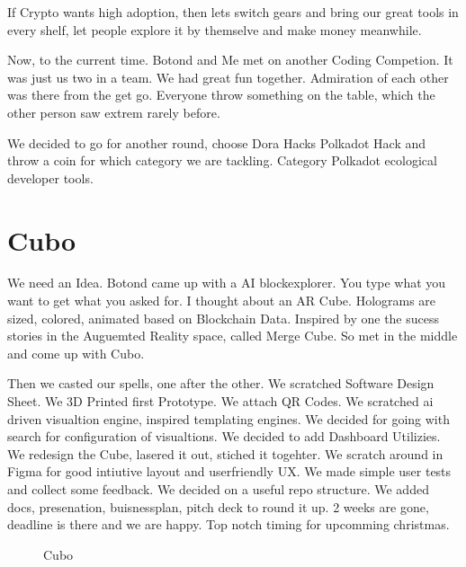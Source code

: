 \documentclass{report}
\begin{document}
If Crypto wants high adoption, then lets switch gears and bring our great tools in every shelf, let people explore it by themselve and make money meanwhile.

Now, to the current time.
Botond and Me met on another Coding Competion. It was just us two in a team.
We had great fun together.
Admiration of each other was there from the get go.
Everyone throw something on the table, which the other person saw extrem rarely before.

We decided to go for another round, choose Dora Hacks Polkadot Hack and throw a coin for which category we are tackling.
Category Polkadot ecological developer tools.

\newpage

\section{Cubo}

We need an Idea. Botond came up with a AI blockexplorer.
You type what you want to get what you asked for.
I thought about an AR Cube. Holograms are sized, colored, animated based on Blockchain Data.
Inspired by one the sucess stories in the Auguemted Reality space, called Merge Cube.
So met in the middle and come up with Cubo.

Then we casted our spells, one after the other. We scratched Software Design Sheet.
We 3D Printed first Prototype.
We attach QR Codes.
We scratched ai driven visualtion engine, inspired templating engines.
We decided for going with search for configuration of visualtions.
We decided to add Dashboard Utilizies.
We redesign the Cube, lasered it out, stiched it togehter.
We scratch around in Figma for good intiutive layout and userfriendly UX.
We made simple user tests and collect some feedback.
We decided on a useful repo structure.
We added docs, presenation, buisnessplan, pitch deck to round it up.
2 weeks are gone, deadline is there and we are happy. Top notch timing for upcomming christmas.

\begin{figure}[hbp]
	\centering
	\hspace{1cm}
	\caption{Cubo}
	\label{fig:Cubo}
\end{figure}
\end{document}

